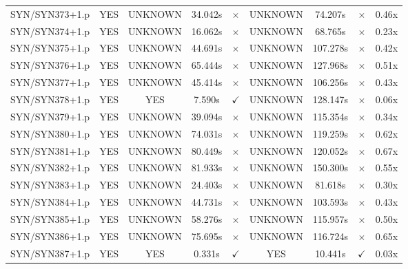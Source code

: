 \documentclass[a4paper,10pt]{article}
\begin{document}
\begin{longtable}{lcccccccc}
SYN/SYN373+1.p & YES & UNKNOWN & 34.042s & \cellcolor{mismatchcolor}$\times$ & UNKNOWN & 74.207s & \cellcolor{mismatchcolor}$\times$ & 0.46x \\
SYN/SYN374+1.p & YES & UNKNOWN & 16.062s & \cellcolor{mismatchcolor}$\times$ & UNKNOWN & 68.765s & \cellcolor{mismatchcolor}$\times$ & 0.23x \\
SYN/SYN375+1.p & YES & UNKNOWN & 44.691s & \cellcolor{mismatchcolor}$\times$ & UNKNOWN & 107.278s & \cellcolor{mismatchcolor}$\times$ & 0.42x \\
SYN/SYN376+1.p & YES & UNKNOWN & 65.444s & \cellcolor{mismatchcolor}$\times$ & UNKNOWN & 127.968s & \cellcolor{mismatchcolor}$\times$ & 0.51x \\
SYN/SYN377+1.p & YES & UNKNOWN & 45.414s & \cellcolor{mismatchcolor}$\times$ & UNKNOWN & 106.256s & \cellcolor{mismatchcolor}$\times$ & 0.43x \\
SYN/SYN378+1.p & YES & YES & 7.590s & \cellcolor{matchcolor}$\checkmark$ & UNKNOWN & 128.147s & \cellcolor{mismatchcolor}$\times$ & 0.06x \\
SYN/SYN379+1.p & YES & UNKNOWN & 39.094s & \cellcolor{mismatchcolor}$\times$ & UNKNOWN & 115.354s & \cellcolor{mismatchcolor}$\times$ & 0.34x \\
SYN/SYN380+1.p & YES & UNKNOWN & 74.031s & \cellcolor{mismatchcolor}$\times$ & UNKNOWN & 119.259s & \cellcolor{mismatchcolor}$\times$ & 0.62x \\
SYN/SYN381+1.p & YES & UNKNOWN & 80.449s & \cellcolor{mismatchcolor}$\times$ & UNKNOWN & 120.052s & \cellcolor{mismatchcolor}$\times$ & 0.67x \\
SYN/SYN382+1.p & YES & UNKNOWN & 81.933s & \cellcolor{mismatchcolor}$\times$ & UNKNOWN & 150.300s & \cellcolor{mismatchcolor}$\times$ & 0.55x \\
SYN/SYN383+1.p & YES & UNKNOWN & 24.403s & \cellcolor{mismatchcolor}$\times$ & UNKNOWN & 81.618s & \cellcolor{mismatchcolor}$\times$ & 0.30x \\
SYN/SYN384+1.p & YES & UNKNOWN & 44.731s & \cellcolor{mismatchcolor}$\times$ & UNKNOWN & 103.593s & \cellcolor{mismatchcolor}$\times$ & 0.43x \\
SYN/SYN385+1.p & YES & UNKNOWN & 58.276s & \cellcolor{mismatchcolor}$\times$ & UNKNOWN & 115.957s & \cellcolor{mismatchcolor}$\times$ & 0.50x \\
SYN/SYN386+1.p & YES & UNKNOWN & 75.695s & \cellcolor{mismatchcolor}$\times$ & UNKNOWN & 116.724s & \cellcolor{mismatchcolor}$\times$ & 0.65x \\
SYN/SYN387+1.p & YES & YES & 0.331s & \cellcolor{matchcolor}$\checkmark$ & YES & 10.441s & \cellcolor{matchcolor}$\checkmark$ & 0.03x \\

\end{longtable}
\end{document}

